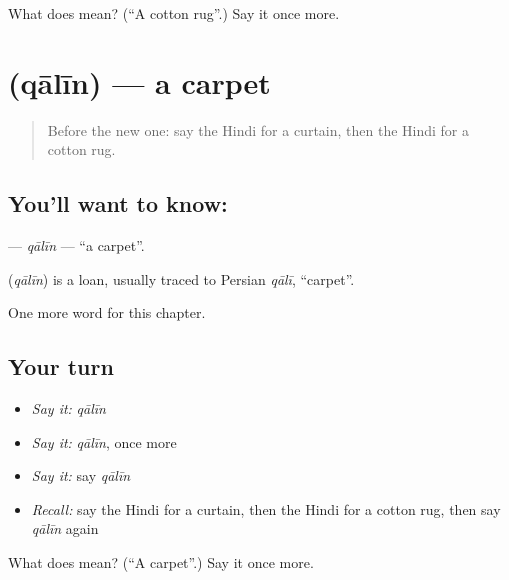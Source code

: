 \begin{tcolorbox}[breakable,colback=teal!4,colframe=teal!35!black,title={Before you move on}]
What does  mean? (\textquotedblleft{}A cotton rug\textquotedblright{}.) Say it once more.
\end{tcolorbox}
\section[\texorpdfstring{\hi{क़ालीन} (qālīn)}{क़ालीन (qālīn)}]{ (qālīn) — a carpet}

\label{lesson:HI-C265-qalin}



\begin{quote}
Before the new one: say the Hindi for a curtain, then the Hindi for a cotton rug.
\end{quote}

\subsection*{You'll want to know: }
\textbf{} — \emph{qālīn} — \textquotedblleft{}a carpet\textquotedblright{}.

\begin{cousinweb}
\textbf{} (\emph{qālīn}) is a loan, usually traced to Persian \emph{qālī}, \textquotedblleft{}carpet\textquotedblright{}.
\end{cousinweb}

\begin{grammarlens}[title={What you've built}]
One more word for this chapter.
\end{grammarlens}

\subsection*{Your turn}
\begin{itemize}
\raggedright
  \item \emph{Say it:} \emph{qālīn}
  \item \emph{Say it:} \emph{qālīn}, once more
  \item \emph{Say it:} say \emph{qālīn}
  \item \emph{Recall:} say the Hindi for a curtain, then the Hindi for a cotton rug, then say \emph{qālīn} again
\end{itemize}

\begin{tcolorbox}[breakable,colback=teal!4,colframe=teal!35!black,title={Before you move on}]
What does  mean? (\textquotedblleft{}A carpet\textquotedblright{}.) Say it once more.
\end{tcolorbox}
